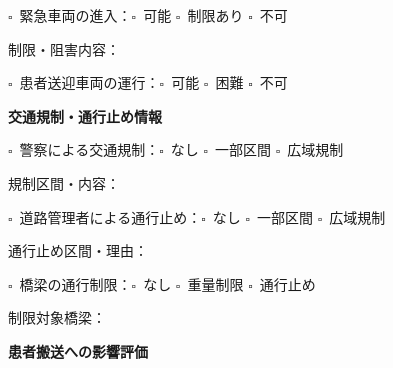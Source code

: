 \documentclass[a4paper,12pt]{jarticle}
\newcommand{\checkbox}{$\square$\ }
\newcommand{\underlinespace}[1]{\underline{\hspace{#1}}}
\begin{document}
\vspace{3mm}

\noindent
\checkbox 緊急車両の進入：\checkbox 可能 \quad \checkbox 制限あり \quad \checkbox 不可

\vspace{2mm}

\noindent
制限・阻害内容：\underlinespace{10cm}

\vspace{3mm}

\noindent
\checkbox 患者送迎車両の運行：\checkbox 可能 \quad \checkbox 困難 \quad \checkbox 不可

\vspace{8mm}

\begin{center}
\textbf{\large 交通規制・通行止め情報}
\end{center}

\vspace{3mm}

\noindent
\checkbox 警察による交通規制：\checkbox なし \quad \checkbox 一部区間 \quad \checkbox 広域規制

\vspace{2mm}

\noindent
規制区間・内容：\underlinespace{10cm}

\vspace{3mm}

\noindent
\checkbox 道路管理者による通行止め：\checkbox なし \quad \checkbox 一部区間 \quad \checkbox 広域規制

\vspace{2mm}

\noindent
通行止め区間・理由：\underlinespace{10cm}

\vspace{3mm}

\noindent
\checkbox 橋梁の通行制限：\checkbox なし \quad \checkbox 重量制限 \quad \checkbox 通行止め

\vspace{2mm}

\noindent
制限対象橋梁：\underlinespace{10cm}

\vspace{8mm}

\begin{center}
\textbf{\large 患者搬送への影響評価}
\end{center}

\vspace{3mm}
\end{document}

